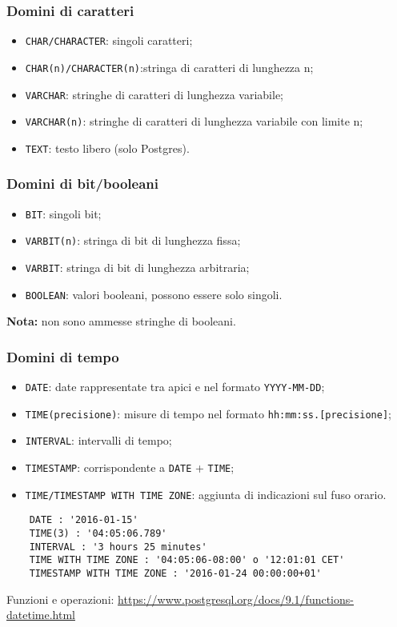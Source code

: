 \documentclass[a4paper, 10pt, titlepage]{article}
\begin{document}
	\subsubsection{Domini di caratteri}
	\begin{itemize}
		\item \lstinline|CHAR/CHARACTER|: singoli caratteri;
		\item \lstinline|CHAR(n)/CHARACTER(n)|:stringa di caratteri di lunghezza n;
		\item \lstinline|VARCHAR|: stringhe di caratteri di lunghezza variabile;
		\item \lstinline|VARCHAR(n)|: stringhe di caratteri di lunghezza variabile con limite n;
		\item \lstinline|TEXT|: testo libero (solo Postgres).
	\end{itemize}

	\subsubsection{Domini di bit/booleani}
	\begin{itemize}
		\item \lstinline|BIT|: singoli bit;
		\item \lstinline|VARBIT(n)|: stringa di bit di lunghezza fissa;
		\item \lstinline|VARBIT|: stringa di bit di lunghezza arbitraria;
		\item \lstinline|BOOLEAN|: valori booleani, possono essere solo singoli.
	\end{itemize}
	\textbf{Nota:} non sono ammesse stringhe di booleani.
	
	\subsubsection{Domini di tempo}
	\begin{itemize}
		\item \lstinline|DATE|: date rappresentate tra apici e nel formato \verb|YYYY-MM-DD|;
		\item \lstinline|TIME(precisione)|: misure di tempo nel formato \verb|hh:mm:ss.[precisione]|;
		\item \lstinline|INTERVAL|: intervalli di tempo;
		\item \lstinline|TIMESTAMP|: corrispondente a \lstinline|DATE| + \lstinline|TIME|;
		\item \lstinline|TIME/TIMESTAMP WITH TIME ZONE|: aggiunta di indicazioni sul fuso orario.
	\end{itemize}
	\begin{lstlisting}
	DATE : '2016-01-15'
	TIME(3) : '04:05:06.789'
	INTERVAL : '3 hours 25 minutes'
	TIME WITH TIME ZONE : '04:05:06-08:00' o '12:01:01 CET'
	TIMESTAMP WITH TIME ZONE : '2016-01-24 00:00:00+01'
	\end{lstlisting}
	Funzioni e operazioni: \url{https://www.postgresql.org/docs/9.1/functions-datetime.html}
	
\end{document}
